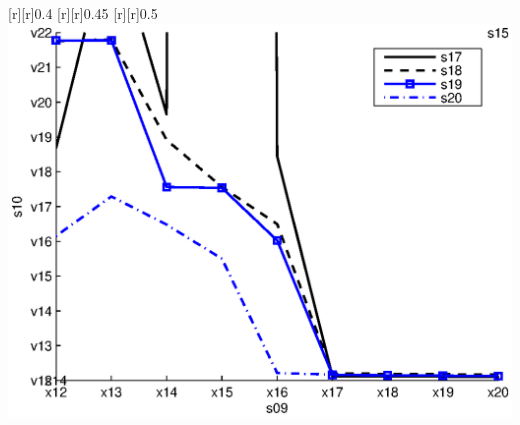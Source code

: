 \begin{psfrags}
[r][r]{0.4}%
[r][r]{0.45}%
[r][r]{0.5}%
%
\includegraphics[width=15cm]{mrmse_300.eps}%
\end{psfrags}%
%
